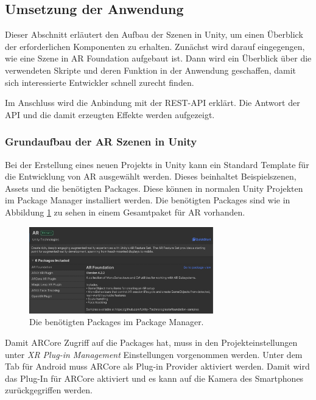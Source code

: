 \subsection{Umsetzung der Anwendung}
\label{technische-umsetzung-umsetzung-der-anwendung}
Dieser Abschnitt erläutert den Aufbau der Szenen in Unity, um einen Überblick der erforderlichen Komponenten zu erhalten. Zunächst wird darauf eingegengen, wie eine Szene in AR Foundation aufgebaut ist. Dann wird ein Überblick über die verwendeten Skripte und deren Funktion in der Anwendung geschaffen, damit sich interessierte Entwickler schnell zurecht finden. 

Im Anschluss wird die Anbindung mit der REST-API erklärt. Die Antwort der API und die damit erzeugten Effekte werden aufgezeigt.

\subsubsection{Grundaufbau der AR Szenen in Unity}
\label{technische-umsetzung-platzierung-auf-einer-beliebigen-flaeche}
Bei der Erstellung eines neuen Projekts in Unity kann ein Standard Template für die Entwicklung von AR ausgewählt werden. Dieses beinhaltet Beispielszenen, Assets und die benötigten Packages. Diese können in normalen Unity Projekten im Package Manager installiert werden. Die benötigten Packages sind wie in Abbildung \ref*{fig:anwendung-umsetzung-packages} zu sehen in einem Gesamtpaket für AR vorhanden.

\begin{figure}[H]
    \centering
    \includegraphics[width=8cm]{img/anwendung/technisch/ar-setup/setup-ar-unity.jpg}
    \caption{Die benötigten Packages im Package Manager.}
    \label{fig:anwendung-umsetzung-packages}
\end{figure}

Damit ARCore Zugriff auf die Packages hat, muss in den Projekteinstellungen unter \textit{XR Plug-in Management} Einstellungen vorgenommen werden. Unter dem Tab für Android muss ARCore als Plug-in Provider aktiviert werden. Damit wird das Plug-In für ARCore aktiviert und es kann auf die Kamera des Smartphones zurückgegriffen werden.

